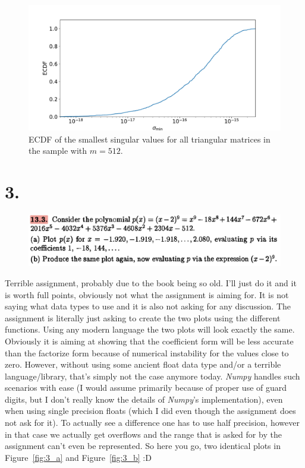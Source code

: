 \documentclass[a4paper, 11pt]{article}
\begin{document}
\begin{figure}
  \centering
  \includegraphics[width=\textwidth]{../2/triangular/ecdf/512.pdf}
  \caption{ECDF of the smallest singular values for all triangular matrices in
  the sample with $m=512$.}
  \label{fig:sigma_min_triangular_ECDF_512}
\end{figure}

\section*{3.}
\begin{figure}
  \centering
  \includegraphics[width=\textwidth]{../3/13_3.jpg}
\end{figure}
Terrible assignment, probably due to the book being so old. I'll just do it and
it is worth full points, obviously not what the assignment is aiming for. It is
not saying what data types to use and it is also not asking for any discussion.
The assignment is literally just asking to create the two plots using the
different functions. Using any modern language the two plots will look exactly
the same. Obviously it is aiming at showing that the coefficient form will be
less accurate than the factorize form because of numerical instability for the
values close to zero. However, without using some ancient float data type
and/or a terrible language/library, that's simply not the case anymore today.
\textit{Numpy} handles such scenarios with ease (I would assume primarily
because of proper use of guard digits, but I don't really know the details of
\textit{Numpy}'s implementation), even when using single precision floats
(which I did even though the assignment does not ask for it). To actually see a
difference one has to use half precision, however in that case we actually get
overflows and the range that is asked for by the assignment can't even be
represented. So here you go, two identical plots in Figure~\ref{fig:3_a} and
Figure~\ref{fig:3_b} \quad :D
\end{document}
